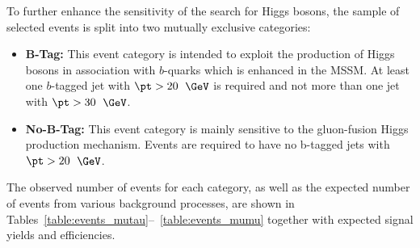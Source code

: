 To further enhance the sensitivity of the search for Higgs bosons, the sample of selected events is split into
two mutually exclusive categories:
\begin{itemize}
\item {\bf B-Tag:} This event category is intended to exploit the production of Higgs bosons in association with $b$-quarks 
which is enhanced in the MSSM. At least one $b$-tagged jet with $\pt>20$~$\GeV$ is required  and not more than one jet with $\pt>30$~$\GeV$. 
\item {\bf No-B-Tag:} This event category is mainly sensitive to the gluon-fusion Higgs production mechanism. Events are required to have no b-tagged jets with $\pt>20$~$\GeV$. 
\end{itemize}


The observed number of events for each category, as well as the expected number of events from various background processes, 
are shown in Tables~\ref{table:events_mutau}--~\ref{table:events_mumu} together with expected signal yields and efficiencies.

